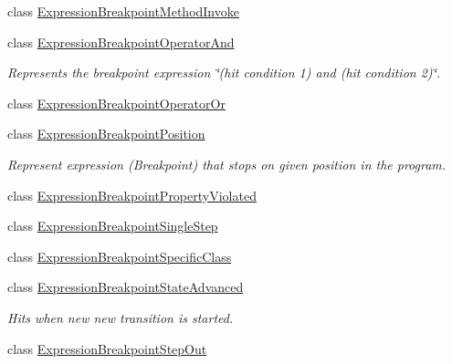 \begin{DoxyCompactItemize}
\item 
class \hyperlink{classgov_1_1nasa_1_1jpf_1_1inspector_1_1server_1_1expression_1_1expressions_1_1_expression_breakpoint_method_invoke}{Expression\+Breakpoint\+Method\+Invoke}
\item 
class \hyperlink{classgov_1_1nasa_1_1jpf_1_1inspector_1_1server_1_1expression_1_1expressions_1_1_expression_breakpoint_operator_and}{Expression\+Breakpoint\+Operator\+And}
\begin{DoxyCompactList}\small\item\em Represents the breakpoint expression \char`\"{}(hit condition 1) and (hit condition 2)\char`\"{}. \end{DoxyCompactList}\item 
class \hyperlink{classgov_1_1nasa_1_1jpf_1_1inspector_1_1server_1_1expression_1_1expressions_1_1_expression_breakpoint_operator_or}{Expression\+Breakpoint\+Operator\+Or}
\item 
class \hyperlink{classgov_1_1nasa_1_1jpf_1_1inspector_1_1server_1_1expression_1_1expressions_1_1_expression_breakpoint_position}{Expression\+Breakpoint\+Position}
\begin{DoxyCompactList}\small\item\em Represent expression (Breakpoint) that stops on given position in the program. \end{DoxyCompactList}\item 
class \hyperlink{classgov_1_1nasa_1_1jpf_1_1inspector_1_1server_1_1expression_1_1expressions_1_1_expression_breakpoint_property_violated}{Expression\+Breakpoint\+Property\+Violated}
\item 
class \hyperlink{classgov_1_1nasa_1_1jpf_1_1inspector_1_1server_1_1expression_1_1expressions_1_1_expression_breakpoint_single_step}{Expression\+Breakpoint\+Single\+Step}
\item 
class \hyperlink{classgov_1_1nasa_1_1jpf_1_1inspector_1_1server_1_1expression_1_1expressions_1_1_expression_breakpoint_specific_class}{Expression\+Breakpoint\+Specific\+Class}
\item 
class \hyperlink{classgov_1_1nasa_1_1jpf_1_1inspector_1_1server_1_1expression_1_1expressions_1_1_expression_breakpoint_state_advanced}{Expression\+Breakpoint\+State\+Advanced}
\begin{DoxyCompactList}\small\item\em Hits when new new transition is started. \end{DoxyCompactList}\item 
class \hyperlink{classgov_1_1nasa_1_1jpf_1_1inspector_1_1server_1_1expression_1_1expressions_1_1_expression_breakpoint_step_out}{Expression\+Breakpoint\+Step\+Out}

\end{DoxyCompactItemize}
